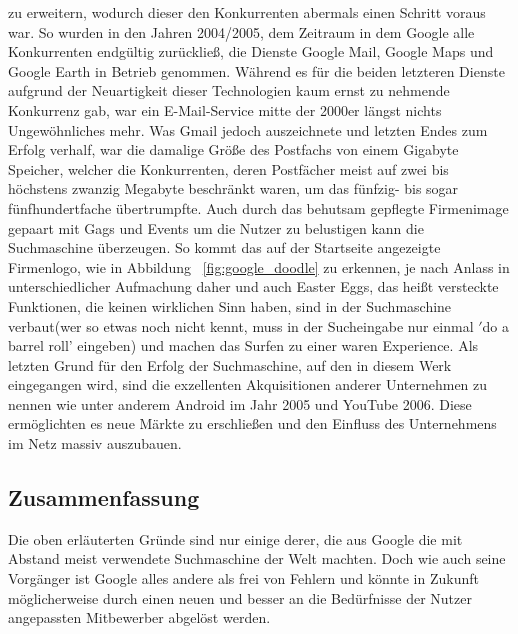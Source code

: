 zu erweitern, wodurch dieser den Konkurrenten abermals einen Schritt voraus war.
So wurden in den Jahren 2004/2005, dem Zeitraum in dem Google alle Konkurrenten endgültig zurückließ, die Dienste Google Mail,
Google Maps und Google Earth in Betrieb genommen.
Während es für die beiden letzteren Dienste aufgrund der Neuartigkeit dieser Technologien kaum ernst zu nehmende
Konkurrenz gab, war ein E-Mail-Service mitte der 2000er längst nichts Ungewöhnliches mehr.
Was Gmail jedoch auszeichnete und letzten Endes zum Erfolg verhalf, war die damalige Größe des Postfachs von einem
Gigabyte Speicher, welcher die Konkurrenten, deren Postfächer meist auf zwei bis höchstens zwanzig Megabyte beschränkt
waren, um das fünfzig- bis sogar fünfhundertfache übertrumpfte.
Auch durch das behutsam gepflegte Firmenimage gepaart mit Gags und Events um die Nutzer zu belustigen kann
die Suchmaschine überzeugen.
So kommt das auf der Startseite angezeigte Firmenlogo, wie in Abbildung ~\ref{fig:google_doodle} zu erkennen, je nach Anlass in
unterschiedlicher Aufmachung daher und auch Easter Eggs, das heißt versteckte Funktionen, die keinen wirklichen Sinn haben,
sind in der Suchmaschine verbaut(wer so etwas noch nicht kennt, muss in der Sucheingabe nur einmal \('\)do a barrel roll' eingeben)
und machen das Surfen zu einer waren Experience.
Als letzten Grund für den Erfolg der Suchmaschine, auf den in diesem Werk eingegangen wird, sind die exzellenten
Akquisitionen anderer Unternehmen zu nennen wie unter anderem Android im Jahr 2005 und YouTube 2006.
Diese ermöglichten es neue Märkte zu erschließen und den Einfluss des Unternehmens im Netz massiv auszubauen.

\subsection{Zusammenfassung}\label{subsec:zusammenfassung}
Die oben erläuterten Gründe sind nur einige derer, die aus Google die mit Abstand meist verwendete Suchmaschine der Welt
machten.
Doch wie auch seine Vorgänger ist Google alles andere als frei von Fehlern und könnte in Zukunft möglicherweise durch einen
neuen und besser an die Bedürfnisse der Nutzer angepassten Mitbewerber abgelöst werden.
